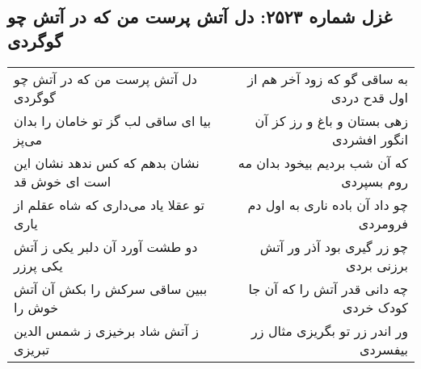 \begin{center}
\section*{غزل شماره ۲۵۲۳: دل آتش پرست من که در آتش چو گوگردی}
\label{sec:2523}
\begin{longtable}{l p{0.5cm} r}
دل آتش پرست من که در آتش چو گوگردی
&&
به ساقی گو که زود آخر هم از اول قدح دردی
\\
بیا ای ساقی لب گز تو خامان را بدان می‌پز
&&
زهی بستان و باغ و رز کز آن انگور افشردی
\\
نشان بدهم که کس ندهد نشان این است ای خوش قد
&&
که آن شب بردیم بیخود بدان مه روم بسپردی
\\
تو عقلا یاد می‌داری که شاه عقلم از یاری
&&
چو داد آن باده ناری به اول دم فرومردی
\\
دو طشت آورد آن دلبر یکی ز آتش یکی پرزر
&&
چو زر گیری بود آذر ور آتش برزنی بردی
\\
ببین ساقی سرکش را بکش آن آتش خوش را
&&
چه دانی قدر آتش را که آن جا کودک خردی
\\
ز آتش شاد برخیزی ز شمس الدین تبریزی
&&
ور اندر زر تو بگریزی مثال زر بیفسردی
\\
\end{longtable}
\end{center}

